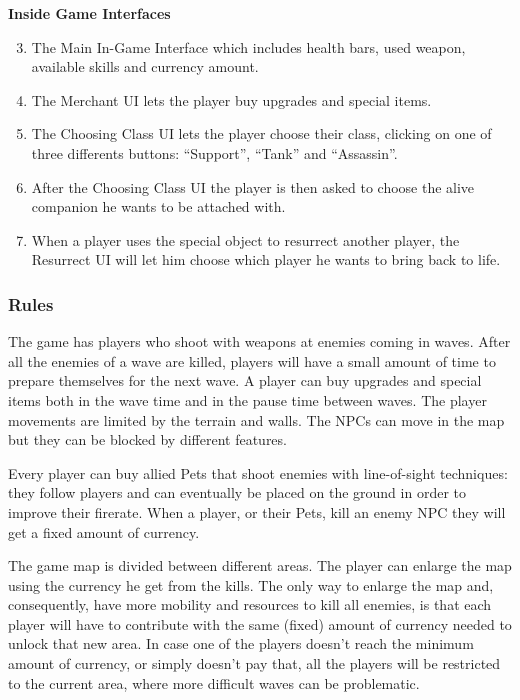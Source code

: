 \documentclass[12pt]{article}
\begin{document}
\textbf{Inside Game Interfaces}
\begin{enumerate}
	\setcounter{enumi}{2}
	\item The Main In-Game Interface which includes health bars, used weapon, available skills and currency amount.
	\item The Merchant UI lets the player buy upgrades and special items.
	\item The Choosing Class UI lets the player choose their class, clicking on one of three differents buttons: “Support”, “Tank” and “Assassin”.
	\item After the Choosing Class UI the player is then asked to choose the alive companion he wants to be attached with.
	\item When a player uses the special object to resurrect another player, the Resurrect UI will let him choose which player he wants to bring back to life.
\end{enumerate}

\subsubsection{Rules}

The game has players who shoot with weapons at enemies coming in waves. After all the enemies of a wave are killed, players will have a small amount of time to prepare themselves for the next wave. A player can buy upgrades and special items both in the wave time and in the pause time between waves. The player movements are limited by the terrain and walls. The NPCs can move in the map but they can be blocked by different features.

Every player can buy allied Pets that shoot enemies with line-of-sight techniques: they follow players and can eventually be placed on the ground in order to improve their firerate. When a player, or their Pets, kill an enemy NPC they will get a fixed amount of currency.

The game map is divided between different areas. The player can enlarge the map using the currency he get from the kills. The only way to enlarge the map and, consequently, have more mobility and resources to kill all enemies, is that each player will have to contribute with the same (fixed) amount of currency needed to unlock that new area. In case one of the players doesn’t reach the minimum amount of currency, or simply doesn’t pay that, all the players will be restricted to the current area, where more difficult waves can be problematic.
\end{document}
